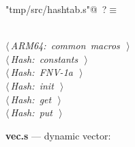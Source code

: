 \documentclass[11pt,a4paper,twoside,openright,DIV=15]{scrbook}
\theoremstyle{definition}
\theoremstyle{plain}
\theoremstyle{remark}
\begin{document}
\begin{flushleft} \small
\begin{minipage}{\linewidth}\label{scrap90}\raggedright\small
{} \verb@"tmp/src/hashtab.s"@\nobreak\ {\footnotesize {?}}$\equiv$
\vspace{-1ex}
\begin{list}{}{} \item
\mbox{}\verb@@\\
\mbox{}\verb@@\hbox{$\langle\,${\itshape ARM64: common macros}\nobreak\ {\footnotesize {}}$\,\rangle$}\verb@@\\
\mbox{}\verb@@\hbox{$\langle\,${\itshape Hash: constants}\nobreak\ {\footnotesize {}}$\,\rangle$}\verb@@\\
\mbox{}\verb@@\hbox{$\langle\,${\itshape Hash: FNV-1a}\nobreak\ {\footnotesize {}}$\,\rangle$}\verb@@\\
\mbox{}\verb@@\hbox{$\langle\,${\itshape Hash: init}\nobreak\ {\footnotesize {}}$\,\rangle$}\verb@@\\
\mbox{}\verb@@\hbox{$\langle\,${\itshape Hash: get}\nobreak\ {\footnotesize {}}$\,\rangle$}\verb@@\\
\mbox{}\verb@@\hbox{$\langle\,${\itshape Hash: put}\nobreak\ {\footnotesize {}}$\,\rangle$}\verb@@\\
\mbox{}\verb@@{\NWsep}
\end{list}
\vspace{-1.5ex}
\footnotesize
\begin{list}{}{\setlength{\itemsep}{-\parsep}\setlength{\itemindent}{-\leftmargin}}

\item{}
\end{list}
\end{minipage}\vspace{4ex}
\end{flushleft}
\noindent\textbf{vec.s} --- dynamic vector:
\end{document}
